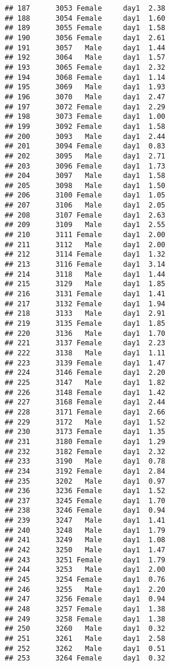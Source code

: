 \documentclass[
]{article}
\begin{document}
\begin{verbatim}
## 187      3053 Female     day1  2.38
## 188      3054 Female     day1  1.60
## 189      3055 Female     day1  1.58
## 190      3056 Female     day1  2.61
## 191      3057   Male     day1  1.44
## 192      3064   Male     day1  1.57
## 193      3065 Female     day1  2.32
## 194      3068 Female     day1  1.14
## 195      3069   Male     day1  1.93
## 196      3070   Male     day1  2.47
## 197      3072 Female     day1  2.29
## 198      3073 Female     day1  1.00
## 199      3092 Female     day1  1.58
## 200      3093   Male     day1  2.44
## 201      3094 Female     day1  0.83
## 202      3095   Male     day1  2.71
## 203      3096 Female     day1  1.73
## 204      3097   Male     day1  1.58
## 205      3098   Male     day1  1.50
## 206      3100 Female     day1  1.05
## 207      3106   Male     day1  2.05
## 208      3107 Female     day1  2.63
## 209      3109   Male     day1  2.55
## 210      3111 Female     day1  2.00
## 211      3112   Male     day1  2.00
## 212      3114 Female     day1  1.32
## 213      3116 Female     day1  3.14
## 214      3118   Male     day1  1.44
## 215      3129   Male     day1  1.85
## 216      3131 Female     day1  1.41
## 217      3132 Female     day1  1.94
## 218      3133   Male     day1  2.91
## 219      3135 Female     day1  1.85
## 220      3136   Male     day1  1.70
## 221      3137 Female     day1  2.23
## 222      3138   Male     day1  1.11
## 223      3139 Female     day1  1.47
## 224      3146 Female     day1  2.20
## 225      3147   Male     day1  1.82
## 226      3148 Female     day1  1.42
## 227      3168 Female     day1  2.44
## 228      3171 Female     day1  2.66
## 229      3172   Male     day1  1.52
## 230      3173 Female     day1  1.35
## 231      3180 Female     day1  1.29
## 232      3182 Female     day1  2.32
## 233      3190   Male     day1  0.78
## 234      3192 Female     day1  2.84
## 235      3202   Male     day1  0.97
## 236      3236 Female     day1  1.52
## 237      3245 Female     day1  1.70
## 238      3246 Female     day1  0.94
## 239      3247   Male     day1  1.41
## 240      3248   Male     day1  1.79
## 241      3249   Male     day1  1.08
## 242      3250   Male     day1  1.47
## 243      3251 Female     day1  1.79
## 244      3253   Male     day1  2.00
## 245      3254 Female     day1  0.76
## 246      3255   Male     day1  2.20
## 247      3256 Female     day1  0.94
## 248      3257 Female     day1  1.38
## 249      3258 Female     day1  1.38
## 250      3260   Male     day1  0.32
## 251      3261   Male     day1  2.58
## 252      3262   Male     day1  0.51
## 253      3264 Female     day1  0.32

\end{verbatim}
\end{document}
